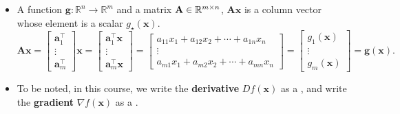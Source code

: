 \documentclass[12pt,thmsa]{article}
\begin{document}
\begin{itemize}
	\item A function \(\boldsymbol{g}: \mathbb{R}^{n} \rightarrow \mathbb{R}^{m}\) and a matrix \(\mathbf{A} \in \mathbb{R}^{\color{black}{m} \times \color{black}{n}} \), \( \mathbf{A} \boldsymbol{x} \) is a column vector whose element is a scalar \(g_{\star}(\boldsymbol{x})\). 
	\[ \mathbf{A} \boldsymbol{x}
	=\left[
	\begin{array}{c}{\boldsymbol{a}_{1}^{\top}} \\ {\vdots} \\ {\boldsymbol{a}_{m}^{\top}}\end{array}
	\right] \boldsymbol{x}
	=\left[
	\begin{array}{c}{
			\boldsymbol{a}_{1}^{\top} \boldsymbol{x}} \\ 
		{\vdots} \\ 
		{\boldsymbol{a}_{m}^{\top}\boldsymbol{x}}
	\end{array}
	\right]
	=\left[
	\begin{array}{c}{
		\boxed{ a_{11} x_{1}+a_{12} x_{2}+\cdots+a_{1 n} x_{n}} } \\ 
		{\vdots} \\ 
		\boxed{ {a_{m 1} x_{1}+a_{m 2} x_{2}+\cdots+a_{m n} x_{n}} }
	\end{array}
	\right]
	=\left[
	\begin{array}{c}{
			g_{1}(\boldsymbol{x})} \\ 
		{\vdots} \\ 
		{g_{m}(\boldsymbol{x})}
	\end{array}
	\right]
	= \boldsymbol{g}(\boldsymbol{x}).
	\]

	\item To be noted, in this course, we write the \textbf{derivative} \(D f(\boldsymbol{x}) \) as a {\color{red}{row vector}}, and write the \textbf{gradient} \( \nabla f(\boldsymbol{x}) \) as a {\color{blue}{column vector}}.
		
\end{itemize}
\end{document}
